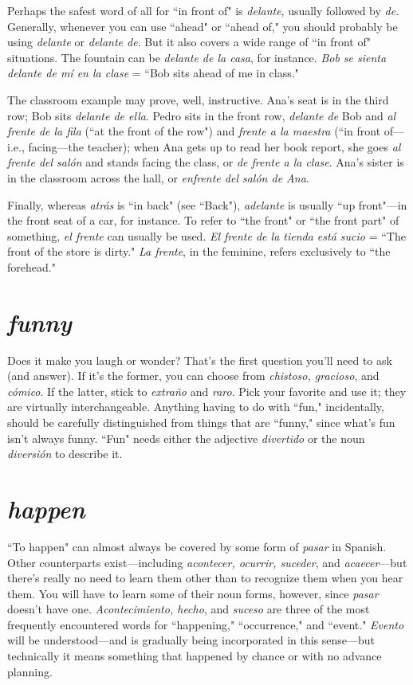Perhaps the safest word of all for ``in front of" is \emph{delante}, usually followed by \emph{de}. Generally, whenever you can use ``ahead" or
``ahead of," you should probably be using \emph{delante} or \emph{delante de}. But it
also covers a wide range of ``in front of" situations. The fountain can
be \emph{delante de la casa}, for instance. \emph{Bob se sienta delante de mí en la
	clase} = ``Bob sits ahead of me in class."

The classroom example may prove, well, instructive. Ana's
seat is in the third row; Bob sits \emph{delante de ella}. Pedro sits in the front
row, \emph{delante de} Bob and \emph{al frente de la fila} (``at the front of the row")
and \emph{frente a la maestra} (``in front of---i.e., facing---the teacher); when
Ana gets up to read her book report, she goes \emph{al frente del salón} and
stands facing the class, or \emph{de frente a la clase}. Ana's sister is in the
classroom across the hall, or \emph{enfrente del salón de Ana}.

Finally, whereas \emph{atrás} is ``in back" (see ``Back"), \emph{adelante} is
usually ``up front"---in the front seat of a car, for instance. To refer to
``the front" or ``the front part" of something, \emph{el frente} can usually be
used. \emph{El frente de la tienda está sucio} = ``The front of the store is
dirty." \emph{La frente}, in the feminine, refers exclusively to ``the forehead."

\section{\emph{funny}}

Does it make you laugh or wonder? That's the first question
you'll need to ask (and answer). If it's the former, you can choose from
\emph{chistoso, gracioso}, and \emph{cómico}. If the latter, stick to \emph{extraño} and \emph{raro}.
Pick your favorite and use it; they are virtually interchangeable. Anything having to do with ``fun," incidentally, should be carefully distinguished from things that are ``funny," since what's fun isn't always
funny. ``Fun" needs either the adjective \emph{divertido} or the noun \emph{diversión} to describe it.

\section{\emph{happen}}

``To happen" can almost always be covered by some form of
\emph{pasar} in Spanish. Other counterparts exist---including \emph{acontecer, ocurrir, suceder}, and \emph{acaecer}---but there's really no need to learn them
other than to recognize them when you hear them. You will have to
learn some of their noun forms, however, since \emph{pasar} doesn't have one.
\emph{Acontecimiento, hecho}, and \emph{suceso} are three of the most frequently
encountered words for ``happening," ``occurrence," and ``event."
\emph{Evento} will be understood---and is gradually being incorporated in this
sense---but technically it means something that happened by chance
or with no advance planning.

